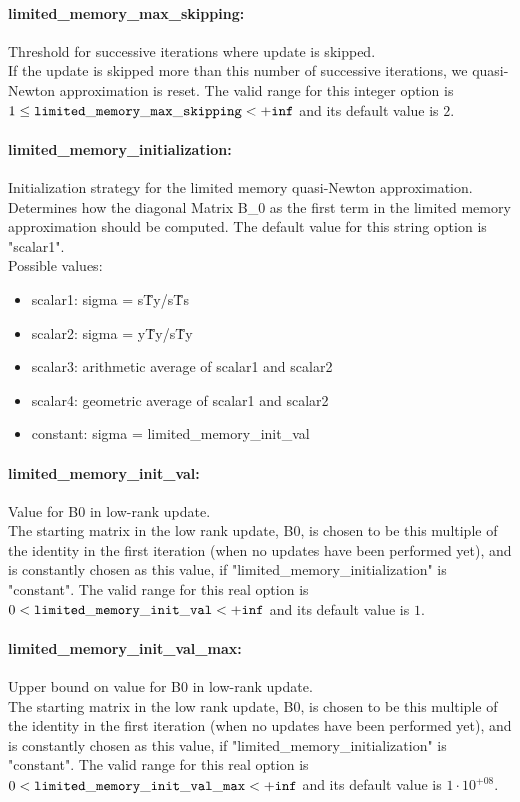 \paragraph{limited\_memory\_max\_skipping:}\label{opt:limited_memory_max_skipping} Threshold for successive iterations where update is skipped. \\
 If the update is skipped more than this number of
successive iterations, we quasi-Newton
approximation is reset. The valid range for this integer option is
$1 \le {\tt limited\_memory\_max\_skipping } <  {\tt +inf}$
and its default value is $2$.


\paragraph{limited\_memory\_initialization:}\label{opt:limited_memory_initialization} Initialization strategy for the limited memory quasi-Newton approximation. \\
 Determines how the diagonal Matrix B\_0 as the
first term in the limited memory approximation
should be computed. The default value for this string option is "scalar1".
\\ 
Possible values:
\begin{itemize}
   \item scalar1: sigma = s\^Ty/s\^Ts
   \item scalar2: sigma = y\^Ty/s\^Ty
   \item scalar3: arithmetic average of scalar1 and scalar2
   \item scalar4: geometric average of scalar1 and scalar2
   \item constant: sigma = limited\_memory\_init\_val
\end{itemize}

\paragraph{limited\_memory\_init\_val:}\label{opt:limited_memory_init_val} Value for B0 in low-rank update. \\
 The starting matrix in the low rank update, B0,
is chosen to be this multiple of the identity in
the first iteration (when no updates have been
performed yet), and is constantly chosen as this
value, if "limited\_memory\_initialization" is
"constant". The valid range for this real option is 
$0 <  {\tt limited\_memory\_init\_val } <  {\tt +inf}$
and its default value is $1$.


\paragraph{limited\_memory\_init\_val\_max:}\label{opt:limited_memory_init_val_max} Upper bound on value for B0 in low-rank update. \\
 The starting matrix in the low rank update, B0,
is chosen to be this multiple of the identity in
the first iteration (when no updates have been
performed yet), and is constantly chosen as this
value, if "limited\_memory\_initialization" is
"constant". The valid range for this real option is 
$0 <  {\tt limited\_memory\_init\_val\_max } <  {\tt +inf}$
and its default value is $1 \cdot 10^{+08}$.


